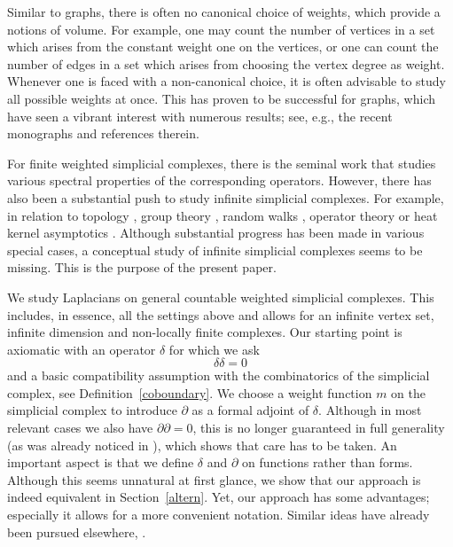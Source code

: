 \documentclass[10pt]{amsart}
\theoremstyle{definition}
\begin{document}
Similar to graphs, there is often no canonical choice of weights, which provide a notions of volume. For example, one may
count the number of vertices in a set which arises from the constant weight one on the vertices, or one can count the number of edges in a set which arises from choosing the vertex degree as weight. Whenever one is faced with a non-canonical choice, it is often advisable to study all possible weights at once. This has proven to be successful for graphs, which have seen a vibrant interest with numerous results; see, e.g., the recent monographs \cite{Barlow,JP,KLW,KN} and references therein. 

For finite weighted simplicial complexes, there is the seminal work \cite{HJ} that studies various spectral properties of the corresponding operators. However, there has also been a substantial push to study infinite simplicial complexes. For example, in relation to topology \cite{F}, group theory \cite{ballmann1997l2,oppenheim2015property,oppenheim2015vanishing}, random walks \cite{LLP,Parzanchevski,Ros}, operator theory \cite{C,BH,GP,Masamune} or heat kernel asymptotics \cite{HL}. Although substantial progress has been made in various special cases, a conceptual study of infinite simplicial complexes seems to be missing. This is the purpose of the present paper.

We study Laplacians on general countable weighted simplicial complexes. This includes, in essence, all the settings above and allows for an infinite vertex set, infinite dimension and non-locally finite complexes. Our starting point is axiomatic with an operator $\delta$ for which we ask
\begin{equation*}
	\delta\delta=0
\end{equation*}
and a basic compatibility assumption with the combinatorics of the simplicial complex, see Definition~\ref{coboundary}. We choose a weight function $m$ on the simplicial complex to introduce $\partial$ as a formal adjoint of $\delta$. Although in most relevant cases we also have $\partial\partial =0$, this is no longer guaranteed in full generality (as was already noticed in \cite{Parzanchevski}), which shows that care has to be taken. An important aspect is that we define $\delta$ and $\partial$ on functions rather than forms. Although this seems unnatural at first glance, we show that our approach is indeed equivalent in Section~\ref{altern}. Yet, our approach has some advantages; especially it allows for a more convenient notation. Similar ideas have already been pursued elsewhere, \cite{BSSS,HK,JM}.
\end{document}

